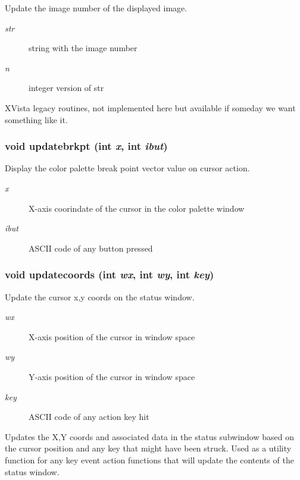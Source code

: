 Update the image number of the displayed image. 

\begin{Desc}
\item[Parameters:]
\begin{description}
\item[{\em str}]string with the image number \item[{\em n}]integer version of str\end{description}
\end{Desc}
XVista legacy routines, not implemented here but available if someday we want something like it. 
\subsubsection{\setlength{\rightskip}{0pt plus 5cm}void updatebrkpt (int {\em x}, int {\em ibut})}\label{xtv_8h_a92}


Display the color palette break point vector value on cursor action. 

\begin{Desc}
\item[Parameters:]
\begin{description}
\item[{\em x}]X-axis coorindate of the cursor in the color palette window \item[{\em ibut}]ASCII code of any button pressed \end{description}
\end{Desc}
\subsubsection{\setlength{\rightskip}{0pt plus 5cm}void updatecoords (int {\em wx}, int {\em wy}, int {\em key})}\label{xtv_8h_a91}


Update the cursor x,y coords on the status window. 

\begin{Desc}
\item[Parameters:]
\begin{description}
\item[{\em wx}]X-axis position of the cursor in window space \item[{\em wy}]Y-axis position of the cursor in window space \item[{\em key}]ASCII code of any action key hit\end{description}
\end{Desc}
Updates the X,Y coords and associated data in the status subwindow based on the cursor position and any key that might have been struck. Used as a utility function for any key event action functions that will update the contents of the status window. 
